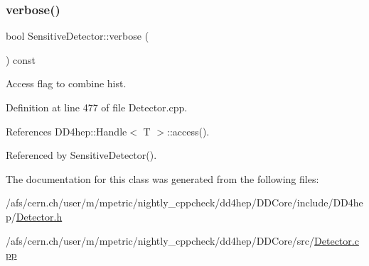 \subsubsection{\texorpdfstring{verbose()}{verbose()}}
{\footnotesize\ttfamily bool Sensitive\+Detector\+::verbose (\begin{DoxyParamCaption}{ }\end{DoxyParamCaption}) const}



Access flag to combine hist. 



Definition at line 477 of file Detector.\+cpp.



References D\+D4hep\+::\+Handle$<$ T $>$\+::access().



Referenced by Sensitive\+Detector().



The documentation for this class was generated from the following files\+:\begin{DoxyCompactItemize}
\item 
/afs/cern.\+ch/user/m/mpetric/nightly\+\_\+cppcheck/dd4hep/\+D\+D\+Core/include/\+D\+D4hep/\hyperlink{_detector_8h}{Detector.\+h}\item 
/afs/cern.\+ch/user/m/mpetric/nightly\+\_\+cppcheck/dd4hep/\+D\+D\+Core/src/\hyperlink{_detector_8cpp}{Detector.\+cpp}\end{DoxyCompactItemize}
